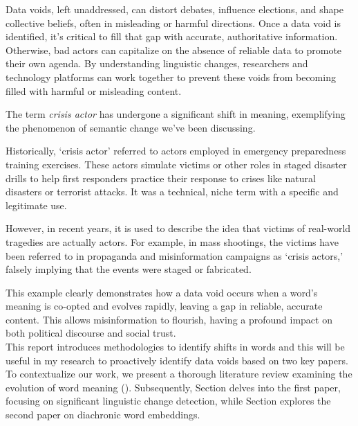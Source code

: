 Data voids, left unaddressed, can distort debates, influence elections, and shape collective beliefs, often in misleading or harmful directions.
Once a data void is identified, it’s critical to fill that gap with accurate, authoritative information.
Otherwise, bad actors can capitalize on the absence of reliable data to promote their own agenda.
By understanding linguistic changes, researchers and technology platforms can work together to prevent these voids from becoming filled with harmful or misleading content.

The term \emph{crisis actor} has undergone a significant shift in meaning,
exemplifying the phenomenon of semantic change we've been discussing.

Historically, `crisis actor' referred to actors employed in emergency preparedness training exercises.
These actors simulate victims or other roles in staged disaster drills to help first responders practice their response to crises like natural disasters or terrorist attacks.
It was a technical, niche term with a specific and legitimate use.

However, in recent years, it is used to describe the idea that victims of real-world tragedies are actually actors.
For example, in mass shootings, the victims have been referred to in propaganda and misinformation campaigns as `crisis actors,'
falsely implying that the events were staged or fabricated.

This example clearly demonstrates how a data void occurs when a word’s meaning is co-opted and evolves rapidly,
leaving a gap in reliable, accurate content.
This allows misinformation to flourish, having a profound impact on both political discourse and social trust.\\

This report introduces methodologies to identify shifts in words and this will be useful in my research to proactively identify data voids based on two key papers.
To contextualize our work, we present a thorough literature review examining the evolution of word meaning ().
Subsequently, Section  delves into the first paper, focusing on significant linguistic change detection,
while Section  explores the second paper on diachronic word embeddings.















